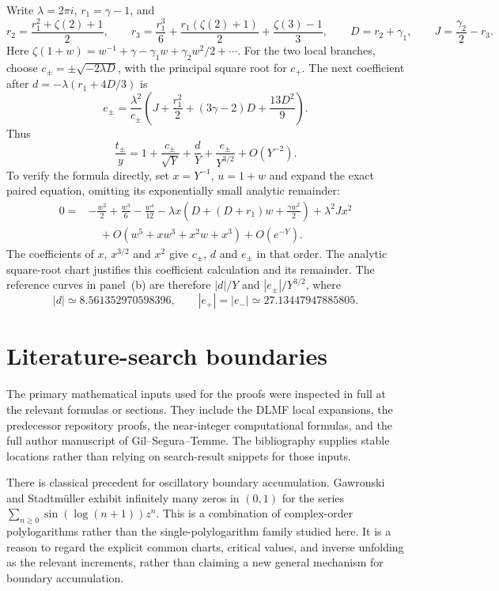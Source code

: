 \documentclass[11pt,a4paper]{article}
\numberwithin{equation}{section}
\theoremstyle{definition}
\theoremstyle{remark}
\begin{document}
Write $\lambda=2\pi i$, $r_1=\gamma-1$, and
\[
 r_2=\frac{r_1^2+\zeta(2)+1}{2},\qquad
 r_3=\frac{r_1^3}{6}+\frac{r_1(\zeta(2)+1)}{2}
       +\frac{\zeta(3)-1}{3},\qquad
 D=r_2+\gamma_1,\qquad J=\frac{\gamma_2}{2}-r_3.
\]
Here $\zeta(1+w)=w^{-1}+\gamma-\gamma_1w+\gamma_2w^2/2+\cdots$.
For the two local branches, choose
$c_\pm=\pm\sqrt{-2\lambda D}$, with the principal square root for $c_+$.
The next coefficient after
$d=-\lambda(r_1+4D/3)$ is
\[
 e_\pm=\frac{\lambda^2}{c_\pm}
 \left(J+\frac{r_1^2}{2}+(3\gamma-2)D+\frac{13D^2}{9}\right).
\]
Thus
\[
 \frac{t_\pm}{y}
 =1+\frac{c_\pm}{\sqrt Y}+\frac dY+
       \frac{e_\pm}{Y^{3/2}}+O(Y^{-2}).
\]
To verify the formula directly, set $x=Y^{-1}$, $u=1+w$ and expand
the exact paired equation, omitting its exponentially small analytic
remainder:
\[
 \begin{split}
 0={}&-\frac{w^2}{2}+\frac{w^3}{6}-\frac{w^4}{12}
 -\lambda x\left(D+(D+r_1)w+\frac{\gamma w^2}{2}\right)
 +\lambda^2Jx^2\\
 &\quad+O(w^5+xw^3+x^2w+x^3)+O(e^{-Y}).
 \end{split}
\]
The coefficients of $x$, $x^{3/2}$ and $x^2$ give $c_\pm$, $d$ and
$e_\pm$ in that order. The analytic square-root chart justifies this
coefficient calculation and its remainder. The reference curves in
panel~\textup{(b)} are therefore $|d|/Y$ and $|e_\pm|/Y^{3/2}$, where
\[
 |d|\simeq 8.561352970598396,\qquad
 |e_+|=|e_-|\simeq 27.13447947885805.
\]

\section{Literature-search boundaries}
\label{app:literature}
The primary mathematical inputs used for the proofs were inspected
in full at the relevant formulas or sections. They include the
DLMF local expansions, the predecessor repository proofs, the
near-integer computational formulas, and the full author manuscript
of Gil--Segura--Temme. The bibliography supplies stable locations
rather than relying on search-result snippets for those inputs.

There is classical precedent for oscillatory boundary accumulation.
Gawronski and Stadtm\"uller \cite{gawronski-stadtmuller} exhibit
infinitely many zeros in $(0,1)$ for the series
$\sum_{n\ge0}\sin(\log(n+1))z^n$. This is a combination of
complex-order polylogarithms rather than the single-polylogarithm
family studied here. It is a reason to regard the explicit common
charts, critical values, and inverse unfolding as the relevant
increments, rather than claiming a new general mechanism for
boundary accumulation.
\end{document}
